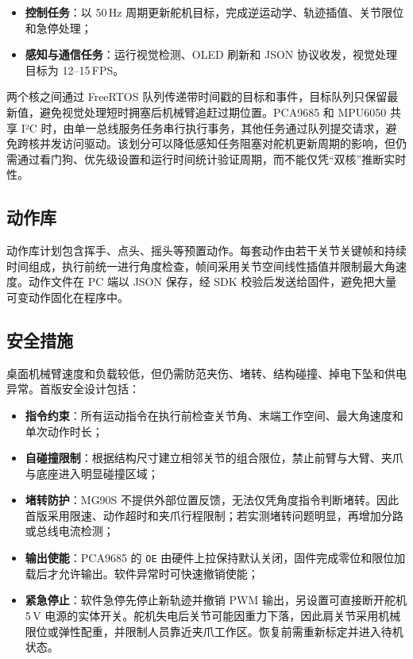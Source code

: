 \begin{itemize}
  \item \textbf{控制任务}：以 50\,Hz 周期更新舵机目标，完成逆运动学、轨迹插值、关节限位和急停处理；
  \item \textbf{感知与通信任务}：运行视觉检测、OLED 刷新和 JSON 协议收发，视觉处理目标为 12--15\,FPS。
\end{itemize}

两个核之间通过 FreeRTOS 队列传递带时间戳的目标和事件，目标队列只保留最新值，避免视觉处理短时拥塞后机械臂追赶过期位置。PCA9685 和 MPU6050 共享 I²C 时，由单一总线服务任务串行执行事务，其他任务通过队列提交请求，避免跨核并发访问驱动。该划分可以降低感知任务阻塞对舵机更新周期的影响，但仍需通过看门狗、优先级设置和运行时间统计验证周期，而不能仅凭“双核”推断实时性。

\subsection{动作库}

动作库计划包含挥手、点头、摇头等预置动作。每套动作由若干关节关键帧和持续时间组成，执行前统一进行角度检查，帧间采用关节空间线性插值并限制最大角速度。动作文件在 PC 端以 JSON 保存，经 SDK 校验后发送给固件，避免把大量可变动作固化在程序中。

\subsection{安全措施}

桌面机械臂速度和负载较低，但仍需防范夹伤、堵转、结构碰撞、掉电下坠和供电异常。首版安全设计包括：

\begin{itemize}
  \item \textbf{指令约束}：所有运动指令在执行前检查关节角、末端工作空间、最大角速度和单次动作时长；
  \item \textbf{自碰撞限制}：根据结构尺寸建立相邻关节的组合限位，禁止前臂与大臂、夹爪与底座进入明显碰撞区域；
  \item \textbf{堵转防护}：MG90S 不提供外部位置反馈，无法仅凭角度指令判断堵转。因此首版采用限速、动作超时和夹爪行程限制；若实测堵转问题明显，再增加分路或总线电流检测；
  \item \textbf{输出使能}：PCA9685 的 \texttt{OE} 由硬件上拉保持默认关闭，固件完成零位和限位加载后才允许输出。软件异常时可快速撤销使能；
  \item \textbf{紧急停止}：软件急停先停止新轨迹并撤销 PWM 输出，另设置可直接断开舵机 5\,V 电源的实体开关。舵机失电后关节可能因重力下落，因此肩关节采用机械限位或弹性配重，并限制人员靠近夹爪工作区。恢复前需重新标定并进入待机状态。
\end{itemize}
